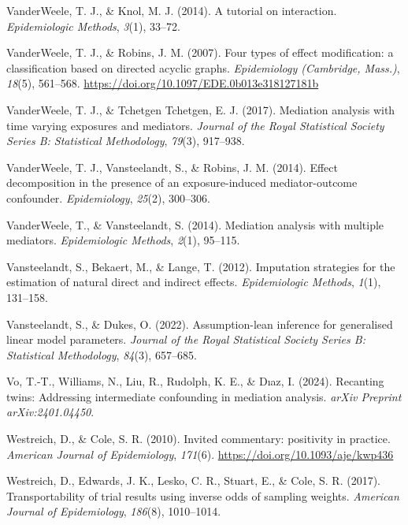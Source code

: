 \documentclass[
  single column]{article}
\newlength{\cslhangindent}
\newenvironment{CSLReferences}[2] %
 {\begin{list}{}{%
  \setlength{\itemindent}{0pt}
  \setlength{\leftmargin}{0pt}
  \setlength{\parsep}{0pt}
  \ifodd #1
   \setlength{\leftmargin}{\cslhangindent}
   \setlength{\itemindent}{-1\cslhangindent}
  \fi
  \setlength{\itemsep}{#2\baselineskip}}}
 {\end{list}}
\begin{document}
\begin{CSLReferences}{1}{0}
VanderWeele, T. J., \& Knol, M. J. (2014). A tutorial on interaction.
\emph{Epidemiologic Methods}, \emph{3}(1), 33--72.

VanderWeele, T. J., \& Robins, J. M. (2007). Four types of effect
modification: a classification based on directed acyclic graphs.
\emph{Epidemiology (Cambridge, Mass.)}, \emph{18}(5), 561--568.
\url{https://doi.org/10.1097/EDE.0b013e318127181b}

VanderWeele, T. J., \& Tchetgen Tchetgen, E. J. (2017). Mediation
analysis with time varying exposures and mediators. \emph{Journal of the
Royal Statistical Society Series B: Statistical Methodology},
\emph{79}(3), 917--938.

VanderWeele, T. J., Vansteelandt, S., \& Robins, J. M. (2014). Effect
decomposition in the presence of an exposure-induced mediator-outcome
confounder. \emph{Epidemiology}, \emph{25}(2), 300--306.

VanderWeele, T., \& Vansteelandt, S. (2014). Mediation analysis with
multiple mediators. \emph{Epidemiologic Methods}, \emph{2}(1), 95--115.

Vansteelandt, S., Bekaert, M., \& Lange, T. (2012). Imputation
strategies for the estimation of natural direct and indirect effects.
\emph{Epidemiologic Methods}, \emph{1}(1), 131--158.

Vansteelandt, S., \& Dukes, O. (2022). Assumption-lean inference for
generalised linear model parameters. \emph{Journal of the Royal
Statistical Society Series B: Statistical Methodology}, \emph{84}(3),
657--685.

Vo, T.-T., Williams, N., Liu, R., Rudolph, K. E., \& Dıaz, I. (2024).
Recanting twins: Addressing intermediate confounding in mediation
analysis. \emph{arXiv Preprint arXiv:2401.04450}.

Westreich, D., \& Cole, S. R. (2010). Invited commentary: positivity in
practice. \emph{American Journal of Epidemiology}, \emph{171}(6).
\url{https://doi.org/10.1093/aje/kwp436}

Westreich, D., Edwards, J. K., Lesko, C. R., Stuart, E., \& Cole, S. R.
(2017). Transportability of trial results using inverse odds of sampling
weights. \emph{American Journal of Epidemiology}, \emph{186}(8),
1010--1014.


\end{CSLReferences}
\end{document}
